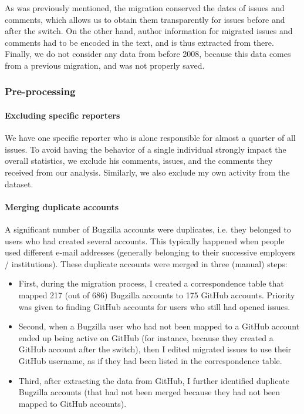 As was previously mentioned, the migration conserved the dates of issues and comments, which allows us to obtain them transparently for issues before and after the switch.
On the other hand, author information for migrated issues and comments had to be encoded in the text, and is thus extracted from there.
Finally, we do not consider any data from before 2008, because this data comes from a previous migration, and was not properly saved.

\subsubsection{Pre-processing}

\label{sec:pre-processing}

\paragraph{Excluding specific reporters}

We have one specific reporter who is alone responsible for almost a quarter of all issues. To avoid having the behavior of a single individual strongly impact the overall statistics, we exclude his comments, issues, and the comments they received from our analysis. Similarly, we also exclude my own activity from the dataset.

\paragraph{Merging duplicate accounts}

A significant number of Bugzilla accounts were duplicates, i.e. they belonged to users who had created several accounts. This typically happened when people used different e-mail addresses (generally belonging to their successive employers / institutions). These duplicate accounts were merged in three (manual) steps:

\begin{itemize}
	\item First, during the migration process, I created a correspondence table that mapped 217 (out of 686) Bugzilla accounts to 175 GitHub accounts. Priority was given to finding GitHub accounts for users who still had opened issues.
	\item Second, when a Bugzilla user who had not been mapped to a GitHub account ended up being active on GitHub (for instance, because they created a GitHub account after the switch), then I edited migrated issues to use their GitHub username, as if they had been listed in the correspondence table.
	\item Third, after extracting the data from GitHub, I further identified duplicate Bugzilla accounts (that had not been merged because they had not been mapped to GitHub accounts).
\end{itemize}

